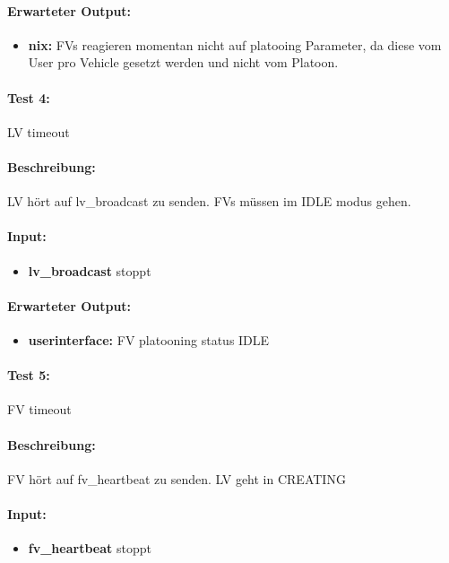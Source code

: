 \documentclass[a4paper, 12pt, titlepage]{scrartcl}
\begin{document}
{			\paragraph{Erwarteter Output:}
			\begin{itemize} \itemsep-0.5em
				\item \textbf{nix:} FVs reagieren momentan nicht auf platooing Parameter, da diese vom User pro Vehicle gesetzt werden und nicht vom Platoon.
			\end{itemize}

			\paragraph{Test 4:}{LV timeout}
			\paragraph{Beschreibung:} LV hört auf lv\_broadcast zu senden. FVs müssen im IDLE modus gehen.
			\paragraph{Input:}
			\begin{itemize} \itemsep-0.5em
				\item \textbf{lv\_broadcast} stoppt 
			\end{itemize}

			\paragraph{Erwarteter Output:}
			\begin{itemize} \itemsep-0.5em
				\item \textbf{userinterface:} FV platooning status IDLE
			\end{itemize}

			\paragraph{Test 5:}{FV timeout}
			\paragraph{Beschreibung:} FV hört auf fv\_heartbeat zu senden. LV geht in CREATING
			\paragraph{Input:}
			\begin{itemize} \itemsep-0.5em
				\item \textbf{fv\_heartbeat} stoppt 
			\end{itemize}

}
\end{document}
